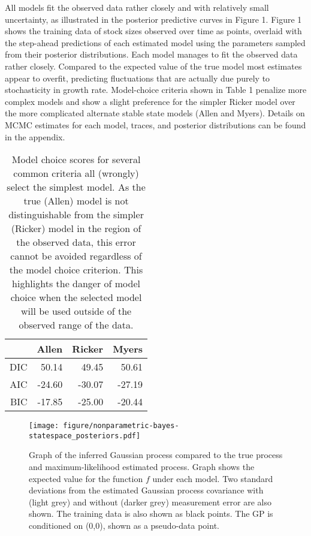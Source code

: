 \documentclass[author-year, review]{elsarticle} %
\makeatletter
\def\maxwidth{\ifdim\Gin@nat@width>\linewidth\linewidth
\else\Gin@nat@width\fi}
\let\Oldincludegraphics\includegraphics
\renewcommand{\includegraphics}[1]{\Oldincludegraphics[width=\maxwidth]{#1}}
\makeatother
\begin{document}
All models fit the observed data rather closely and with relatively
small uncertainty, as illustrated in the posterior predictive curves in
Figure 1. Figure 1 shows the training data of stock sizes observed over
time as points, overlaid with the step-ahead predictions of each
estimated model using the parameters sampled from their posterior
distributions. Each model manages to fit the observed data rather
closely. Compared to the expected value of the true model most estimates
appear to overfit, predicting fluctuations that are actually due purely
to stochasticity in growth rate. Model-choice criteria shown in Table 1
penalize more complex models and show a slight preference for the
simpler Ricker model over the more complicated alternate stable state
models (Allen and Myers). Details on MCMC estimates for each model,
traces, and posterior distributions can be found in the appendix.

\begin{table}[ht]
\begin{center}
\begin{tabular}{rrrr}
  \hline
 & Allen & Ricker & Myers \\ 
  \hline
DIC & 50.14 & 49.45 & 50.61 \\ 
  AIC & -24.60 & -30.07 & -27.19 \\ 
  BIC & -17.85 & -25.00 & -20.44 \\ 
   \hline
\end{tabular}
\caption{Model choice scores for several common criteria all (wrongly) select the simplest model. As the true (Allen) model is not distinguishable from the simpler (Ricker) model in the region of the observed data, this error cannot be avoided regardless of the model choice criterion. This highlights the danger of model choice when the selected model will be used outside of the observed range of the data.}
\end{center}
\end{table}

\begin{figure}[htbp]
\centering
\texttt{[image: figure/nonparametric-bayes-statespace\_posteriors.pdf]}
\caption{Graph of the inferred Gaussian process compared to the true
process and maximum-likelihood estimated process. Graph shows the
expected value for the function $f$ under each model. Two standard
deviations from the estimated Gaussian process covariance with (light
grey) and without (darker grey) measurement error are also shown. The
training data is also shown as black points. The GP is conditioned on
(0,0), shown as a pseudo-data point.}
\end{figure}
\end{document}
